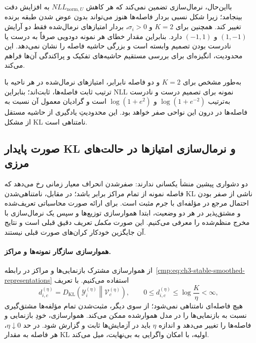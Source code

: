 بااین‌حال، نرمال‌سازی تضمین نمی‌کند که هر کاهش $NLL_{\mathrm{norm},U}$ به افزایش دقت بینجامد؛ زیرا شکل نسبی بردار فاصله‌ها هنوز می‌تواند بدون عوض شدن طبقه برنده تغییر کند. همچنین برای $K=2$ و $\sigma_i>0$، بردار امتیازهای نرمال‌شده فقط دو آرایش $(1,-1)$ و $(-1,1)$ دارد. بنابراین مقدار خطای هر نمونه دودویی صرفاً به درست یا نادرست بودن تصمیم وابسته است و بزرگی حاشیه فاصله را نشان نمی‌دهد. این محدودیت، انگیزه‌ای برای بررسی مستقیم حاشیه‌های تفکیک و پراکندگی آن‌ها فراهم می‌کند.

به‌طور مشخص برای $K=2$ و دو فاصله نابرابر،
امتیازهای نرمال‌شده در هر ناحیه با ترتیب ثابت
فاصله‌ها، ثابت‌اند؛ بنابراین NLL نمونه
برای تصمیم درست و نادرست به‌ترتیب
$\log(1+e^{-2})$ و $\log(1+e^2)$ است
و گرادیان معمول آن نسبت به فاصله‌ها
در درون این نواحی صفر خواهد بود.
این محدودیتِ یادگیری از حاشیه مستقل
از مشکل KL نامتناهی است.






\subsection{صورت پایدار KL و نرمال‌سازی امتیازها در حالت‌های مرزی}
\label{cmp:subsec:ch3-stable-KL-normalization}
دو دشواری پیشین منشأ یکسانی ندارند: صفرشدن
انحراف معیار زمانی رخ می‌دهد که فاصله نمونه
از تمام مراکز برابر باشد؛ در مقابل،
نامتناهی‌شدن KL ناشی از صفر بودن
احتمال مرجع در مؤلفه‌ای با جرم مثبت است.
برای ارائه صورت محاسباتی تعریف‌شده و
مشتق‌پذیر در هر دو وضعیت، ابتدا
هموارسازی توزیع‌ها و سپس یک نرمال‌سازی
با مخرج منظم‌شده را معرفی می‌کنیم.
این صورت \emph{مکمل} تعریف دقیق قبلی است
و نتایج آن جایگزین خودکار کران‌های
صورت قبلی نیستند.

\paragraph{هموارسازی سازگار نمونه‌ها و مراکز.}
از هموارسازی مشترک بازنمایی‌ها و مراکز در
رابطه~\eqref{cmp:eq:ch3-stable-smoothed-representations}
استفاده می‌کنیم. با تعریف
\begin{equation}\label{cmp:eq:ch3-stable-KL-distance}
d_{i,c}^{(\eta)}
=D_{\mathrm{KL}}\!\left(
\mathscr Y_i^{(\eta)}\middle\|\mathcal V_c^{(\eta)}
\right),
\qquad
0\le d_{i,c}^{(\eta)}\le\log\frac K\eta<\infty,
\end{equation}
هیچ فاصله‌ای نامتناهی نمی‌شود؛
از سوی دیگر، مثبت‌شدن تمام مؤلفه‌ها
مشتق‌گیری نسبت به بازنمایی‌ها را
در مدل هموارشده ممکن می‌کند.
هموارسازی، خودِ بازنمایی و فاصله‌ها
را تغییر می‌دهد و اندازه $\eta$
باید در آزمایش‌ها ثابت و گزارش شود.
در حد $\eta\downarrow0$، هر فاصله
به مقدار KL اولیه، با امکان واگرایی
به بی‌نهایت، میل می‌کند.

